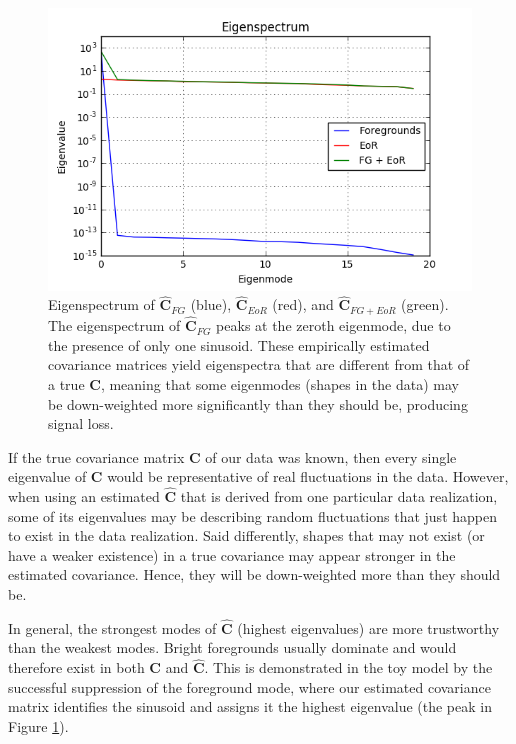 \documentclass[preprint2,numberedappendix,tighten]{aastex6}  %
\begin{document}
\begin{figure}
	\centering
	\includegraphics[trim={0.3cm 0.2cm 0.3cm 0.3cm},clip,width=\columnwidth]{plots/toy_sigloss2.png}
	\caption{Eigenspectrum of $\hat{\textbf{C}}_{FG}$ (blue), $\hat{\textbf{C}}_{EoR}$ (red), and $\hat{\textbf{C}}_{FG+EoR}$ (green). The eigenspectrum of $\hat{\textbf{C}}_{FG}$ peaks at the zeroth eigenmode, due to the presence of only one sinusoid. These empirically estimated covariance matrices yield eigenspectra that are different from that of a true $\textbf{C}$, meaning that some eigenmodes (shapes in the data) may be down-weighted more significantly than they should be, producing signal loss.}
	\label{fig:toy_sigloss2}
\end{figure}

If the true covariance matrix $\textbf{C}$ of our data was known, then every single eigenvalue of $\textbf{C}$ would be representative of real fluctuations in the data. However, when using an estimated $\hat{\textbf{C}}$ that is derived from one particular data realization, some of its eigenvalues may be describing random fluctuations that just happen to exist in the data realization. Said differently, shapes that may not exist (or have a weaker existence) in a true covariance may appear stronger in the estimated covariance. Hence, they will be down-weighted more than they should be.

In general, the strongest modes of $\hat{\textbf{C}}$ (highest eigenvalues) are more trustworthy than the weakest modes. Bright foregrounds usually dominate and would therefore exist in both $\textbf{C}$ and $\hat{\textbf{C}}$. This is demonstrated in the toy model by the successful suppression of the foreground mode, where our estimated covariance matrix identifies the sinusoid and assigns it the highest eigenvalue (the peak in Figure \ref{fig:toy_sigloss2}). 
\end{document}
